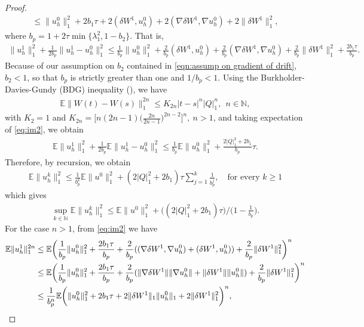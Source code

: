 \documentclass[reqno, 11pt]{amsart}
\theoremstyle{plain}
\theoremstyle{definition}
\theoremstyle{remark}
\numberwithin{equation}{section}
\numberwithin{theorem}{section}
\newcommand{\N}{\mathbb{N}}
\begin{document}
{\begin{proof}
\begin{align}
\leq \|u_h^0\|_1^2+2b_1\tau+2(\delta W^1, u_h^0)+2(\nabla \delta W^1, \nabla u_h^0)+2\|\delta W^1\|_1^2,
\end{align}
where $b_p=1+2\tau\min\{\lambda_1^2,1-b_2\}$. That is,
\begin{align}\label{eq:im2}
\|u_h^1\|_1^2+\frac{1}{2b_p}\|u_h^1-u_h^0\|_1^2\leq \frac{1}{b_p}\|u_h^0\|_1^2+\frac{2}{b_p}(\delta W^1, u_h^0)+\frac{2}{b_p}(\nabla\delta W^1, \nabla u_h^0)+\frac{2}{b_p}\|\delta W^1\|_1^2+\frac{2b_1\tau}{b_p}.
\end{align}
Because of our assumption on $b_2$ contained in \eqref{eqn:assump on gradient of drift}, $b_2<1$, so that $b_p$ is strictly greater than one and $1/b_p<1$. Using the Burkholder-Davies-Gundy (BDG) inequality (\cite[Page 18]{Kruse}),  we have
\begin{align}\label{eq:BDG}
\mathbb{E}\|W(t)-W(s)\|_1^{2n}\leq K_{2n} |t-s|^n |Q|_1^n, \ \ n\in \mathbb{N},
\end{align}
with $K_2=1$ and $K_{2n}=\bigg[n(2n-1)\bigg(\frac{2n}{2n-1}\bigg)^{2n-2}\bigg]^n, \ n>1$,  and 
taking expectation of \eqref{eq:im2}, 
 we obtain
\begin{align}
\mathbb{E}\| u_h^1\|_1^2+\frac{1}{2b_p}\mathbb{E}\| u_h^1-u_h^0\|_1^2\leq \frac{1}{b_p}\mathbb{E}\|u_h^0\|_1^2+\frac{2|Q|_1^2+2b_1}{b_p}\tau.
\end{align}
Therefore, by recursion, we obtain
\begin{align}
\mathbb{E}\| u_h^k\|_1^2\leq {\frac{1}{b_p^k}}\mathbb{E}\|u^0\|_1^2+{(2|Q|_1^2+2b_1)}\tau \sum_{j=1}^k\frac{1}{b_p^j}, \quad \mbox{for every } k\geq 1
\end{align}
which gives
\begin{align}
 \sup_{k \in \N}\mathbb{E}\| u_h^{k}\|_1^2\leq\mathbb{E} \|u^0\|_1^2+\bigg(({2|Q|_1^2+2b_1})\tau\bigg)/\bigg(1-\frac{1}{b_p}\bigg).
\end{align}
For the case $n>1$, from \eqref{eq:im2} we have
\begin{align}\label{eq:pn1}
\mathbb{E}\|u_h^1\|_1^{2n}&\leq \mathbb{E}\bigg(\frac{1}{b_p}\|u_h^0\|_1^2+\frac{2b_1\tau}{b_p}+\frac{2}{b_p}((\nabla\delta W^1, \nabla u_h^0)+(\delta W^1, u_h^0))+\frac{2}{b_p}\|\delta W^1\|_1^2\bigg)^{n}\\
&\leq  \mathbb{E}\bigg(\frac{1}{b_p}\|u_h^0\|_1^2+\frac{2b_1\tau}{b_p}+\frac{2}{b_p}(\|\nabla\delta W^1\| \|\nabla u_h^0\|+\|\delta W^1\|\|u_h^0\|)+\frac{2}{b_p}\|\delta W^1\|_1^2\bigg)^{n}\notag\\
&\leq  \frac{1}{b_p^n}\mathbb{E}\bigg(\|u_h^0\|_1^2+2b_1\tau+2\|\delta W^1\|_1 \| u_h^0\|_1+2\|\delta W^1\|_1^2\bigg)^{n}, \notag

\end{align}
\end{proof}}
\end{document}
